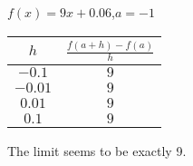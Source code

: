 {$f(x) = 9x+0.06$,\quad  $a=-1$}
{\begin{tabular}{cc}
$h$ & $\frac{f(a+h)-f(a)}{h}$\\ \hline 
 $-0.1$ & $9$ \\
 $-0.01$ & $9$ \\
 $0.01$ & $9$ \\
 $0.1$ & $9$
\end{tabular}
The limit seems to be exactly 9.
}

